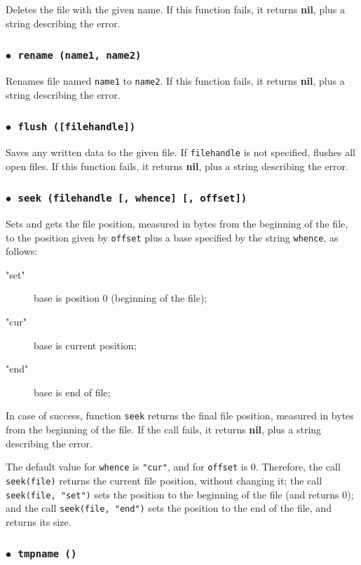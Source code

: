 \documentclass[11pt]{article}
\newcommand{\T}[1]{{\tt #1}}
\newcommand{\nil}{{\bf nil}}
\newcommand{\Deffunc}[1]{\index{#1}}
\newcommand{\ff}{$\bullet$\ }
\begin{document}
Deletes the file with the given name.
If this function fails, it returns \nil,
plus a string describing the error.

\subsubsection*{\ff \T{rename (name1, name2)}}\Deffunc{rename}

Renames file named \verb|name1| to \verb|name2|.
If this function fails, it returns \nil,
plus a string describing the error.

\subsubsection*{\ff \T{flush ([filehandle])}}\Deffunc{flush}

Saves any written data to the given file.
If \verb|filehandle| is not specified,
flushes all open files.
If this function fails, it returns \nil,
plus a string describing the error.

\subsubsection*{\ff \T{seek (filehandle [, whence] [, offset])}}\Deffunc{seek}

Sets and gets the file position,
measured in bytes from the beginning of the file,
to the position given by \verb|offset| plus a base
specified by the string \verb|whence|, as follows:
\begin{description}
\item["set"] base is position 0 (beginning of the file);
\item["cur"] base is current position;
\item["end"] base is end of file;
\end{description}
In case of success, function \verb|seek| returns the final file position,
measured in bytes from the beginning of the file.
If the call fails, it returns \nil,
plus a string describing the error.

The default value for \verb|whence| is \verb|"cur"|,
and for \verb|offset| is 0.
Therefore, the call \verb|seek(file)| returns the current
file position, without changing it;
the call \verb|seek(file, "set")| sets the position to the
beginning of the file (and returns 0);
and the call \verb|seek(file, "end")| sets the position to the
end of the file, and returns its size.

\subsubsection*{\ff \T{tmpname ()}}\Deffunc{tmpname}
\end{document}

